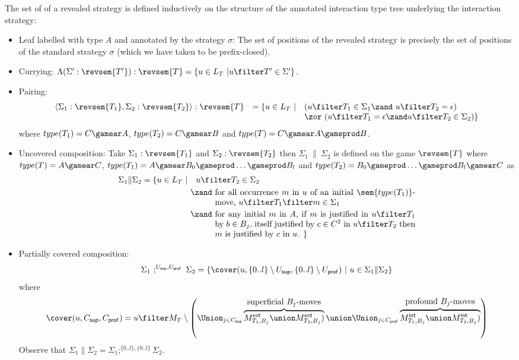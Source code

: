 \begin{definition}
\label{dfn:revealedstrat}
The set of  of a revealed strategy is defined inductively on the
structure of the annotated interaction type tree underlying the
interaction strategy:
\begin{itemize}[-]
\item Leaf labelled with type $A$ and annotated by the strategy $\sigma$: The set of positions of the revealed strategy is precisely the set of positions of the standard strategy $\sigma$ (which we have taken to be prefix-closed).

\item Currying: $\Lambda(\Sigma' : \revsem{T'}) : \revsem{T} = \{ u \in L_T \ |  u \filter T' \in \Sigma'  \}$.

\item Pairing: $$\begin{array}{lcll}
\langle \Sigma_1 : \revsem{T_1}, \Sigma_2 : \revsem{T_2} \rangle : \revsem{T} &= \{ u \in L_T \ | &
   (u \filter T_1 \in \Sigma_1 \zand\ u \filter T_2 = \epsilon) \\
&&  \zor\  ( u \filter T_1 = \epsilon \zand u \filter T_2 \in \Sigma_2) \}
\end{array}$$
where $type(T_1) = C\gamear A$, $type(T_2) = C\gamear B$
and $type(T) = C\gamear A \gameprod B$.

\item Uncovered composition: Take $\Sigma_1 : \revsem{T_1}$ and $\Sigma_2 :\revsem{T_2}$ then $\Sigma_1\ \| \ \Sigma_2$ is defined on the game $\revsem{T}$ where
$type(T) = A \gamear C$, $type(T_1) = A \gamear B_0 \gameprod
\ldots \gameprod B_l$ and $type(T_2) = B_0 \gameprod \ldots
\gameprod B_l \gamear C$ as
\begin{align*}
\Sigma_1 \| \Sigma_2 = \{ u \in L_T  \ | \
& \ \ u \filter T_2 \in \Sigma_2 \\
& \zand\ \parbox[t]{8.5cm}{for all occurrence $m$ in $u$ of an initial
                $\sem{type(T_1)}$-move, $u \filter T_1 \filter m \in \Sigma_1$} \\
& \zand\ \parbox[t]{8.5cm}{for any initial $m$ in $A$, if $m$ is justified in $u \filter T_1$ by $b\in B_j$,
itself justified by $c \in C^2$ in $u \filter T_2$ then $m$ is justified by $c$ in $u$. \} }
\end{align*}

\item Partially covered composition:
$$ \Sigma_1\ ;^{U_{\sf sup},U_{\sf prof}}\ \Sigma_2 = \{ \cover(u,\{0..l\}\setminus U_{\sf sup}, \{0..l\}\setminus U_{\sf prof}) \ | \ u \in \Sigma_1 \| \Sigma_2 \}$$
where
$$\cover(u,C_{\sf sup},C_{\sf prof}) = u \filter  M_T \setminus \left( \Union_{j\in
C_{\sf sup}} \overbrace{M^{\sf ext}_{T_1,B_j} \union M^{\sf ext}_{T_2,B_j})}^{\hbox{superficial $B_j$-moves}}
\union
\Union_{j\in
C_{\sf prof}} \overbrace{M^{\sf int}_{T_1,B_j} \union M^{\sf int}_{T_2,B_j})}^{\hbox{profound $B_j$-moves}} \right)$$
Observe that $\Sigma_1 \| \Sigma_2 = \Sigma_1;^{\{0..l\},\{0..l\}} \Sigma_2$.
\end{itemize}
\end{definition}



